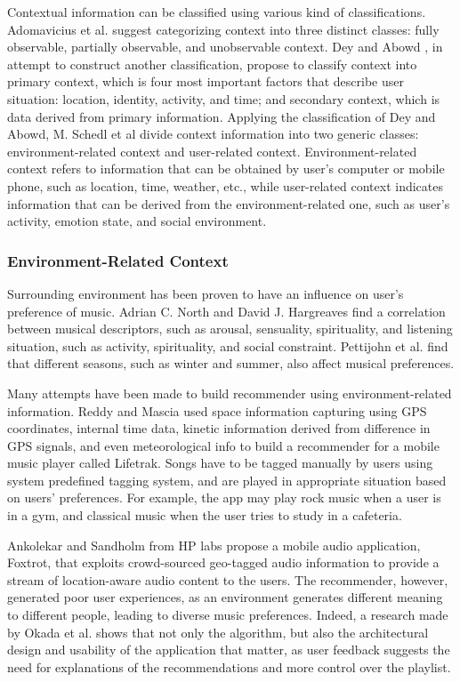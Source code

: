 Contextual information can be classified using various kind of classifications. Adomavicius et al. \cite{adomavicius2011context} suggest categorizing context into three distinct classes: fully observable, partially observable, and unobservable context. Dey and Abowd \cite{abowd1999towards}, in attempt to construct another classification, propose to classify context into primary context, which is four most important factors that describe user situation: location, identity, activity, and time; and secondary context, which is data derived from primary information. Applying the classification of Dey and Abowd, M. Schedl et al \cite{schedl2015music} divide context information into two generic classes: environment-related context and user-related context. Environment-related context refers to information that can be obtained by user's computer or mobile phone, such as location, time, weather, etc., while user-related context indicates information that can be derived from the environment-related one, such as user's activity, emotion state, and social environment. 

\subsubsection{Environment-Related Context}
Surrounding environment has been proven to have an influence on user's preference of music. Adrian C. North and David J. Hargreaves \cite{north1996situational} find a correlation between musical descriptors, such as arousal, sensuality, spirituality, and listening situation, such as activity, spirituality, and social constraint. Pettijohn et al. \cite{pettijohn2010music} find that different seasons, such as winter and summer, also affect musical preferences. 

Many attempts have been made to build recommender using environment-related information. Reddy and Mascia \cite{reddy2006lifetrak} used space information capturing using GPS coordinates, internal time data, kinetic information derived from difference in GPS signals, and even meteorological info to build a recommender for a mobile music player called Lifetrak. Songs have to be tagged manually by users using system predefined tagging system, and are played in appropriate situation based on users' preferences. For example, the app may play rock music when a user is in a gym, and classical music when the user tries to study in a cafeteria. 

Ankolekar and Sandholm from HP labs \cite{ankolekar2011foxtrot} propose a mobile audio application, Foxtrot, that exploits crowd-sourced geo-tagged audio information to provide a stream of location-aware audio content to the users. The recommender, however, generated poor user experiences, as an environment generates different meaning to different people, leading to diverse music preferences. Indeed, a research made by Okada et al. \cite{okada2013contextplayer} shows that not only the algorithm, but also the architectural design and usability of the application that matter, as user feedback suggests the need for explanations of the recommendations and more control over the playlist. 

